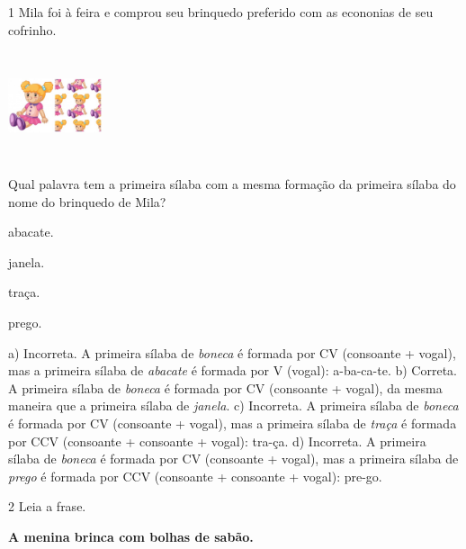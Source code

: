 
\num{1} Mila foi à feira e comprou seu brinquedo preferido com as
econonias de seu cofrinho.

\includegraphics[width=1.08889in,height=1.24236in]{media/image77.jpeg}


Qual palavra tem a primeira sílaba com a mesma formação da primeira
sílaba do nome do brinquedo de Mila?

\begin{minipage}{.5\textwidth}
\begin{escolha}
\item abacate.

\item janela.

\item traça.

\item prego.
\end{escolha}
\end{minipage}

a) Incorreta. A primeira sílaba de \textit{boneca} é formada por CV 
(consoante + vogal), mas a primeira sílaba de \textit{abacate} é formada
por V (vogal): a-ba-ca-te.
b) Correta. A primeira sílaba de \textit{boneca} é formada por CV 
(consoante + vogal), da mesma maneira que a primeira sílaba de 
\textit{janela}. 
c) Incorreta. A primeira sílaba de \textit{boneca} é formada por CV 
(consoante + vogal), mas a primeira sílaba de \textit{traça} é formada
por CCV (consoante + consoante + vogal): tra-ça.
d) Incorreta. A primeira sílaba de \textit{boneca} é formada por CV 
(consoante + vogal), mas a primeira sílaba de \textit{prego} é formada
por CCV (consoante + consoante + vogal): pre-go.

\num{2} Leia a frase.

\textbf{A menina brinca com bolhas de sabão.}

